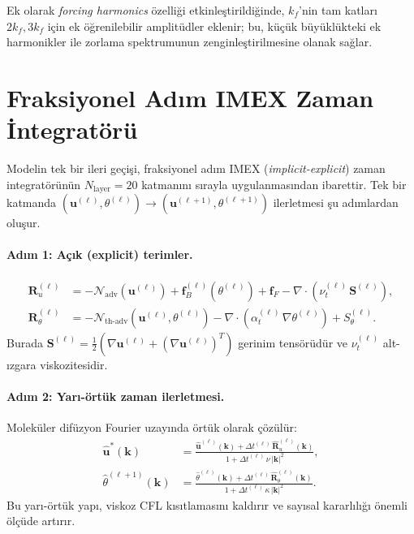 Ek olarak \emph{forcing harmonics} özelliği etkinleştirildiğinde, $k_{f}$'nin tam katları $2k_{f}, 3k_{f}$ için ek öğrenilebilir amplitüdler eklenir; bu, küçük büyüklükteki ek harmonikler ile zorlama spektrumunun zenginleştirilmesine olanak sağlar.

\section{Fraksiyonel Adım IMEX Zaman İntegratörü}
\label{sec:imex_integrator}

Modelin tek bir ileri geçişi, fraksiyonel adım IMEX (\textit{implicit-explicit}) zaman integratörünün $N_{\mathrm{layer}}=20$ katmanını sırayla uygulanmasından ibarettir. Tek bir katmanda $(\mathbf{u}^{(\ell)}, \theta^{(\ell)}) \rightarrow (\mathbf{u}^{(\ell+1)}, \theta^{(\ell+1)})$ ilerletmesi şu adımlardan oluşur.

\paragraph{Adım 1: Açık (explicit) terimler.}
\begin{align}
\mathbf{R}_{u}^{(\ell)} &= -\mathcal{N}_{\mathrm{adv}}(\mathbf{u}^{(\ell)}) + \mathbf{f}_{B}^{(\ell)}(\theta^{(\ell)}) + \mathbf{f}_{F} - \nabla\cdot(\nu_{t}^{(\ell)}\,\mathbf{S}^{(\ell)}), \\
\mathbf{R}_{\theta}^{(\ell)} &= -\mathcal{N}_{\mathrm{th\text{-}adv}}(\mathbf{u}^{(\ell)},\theta^{(\ell)}) - \nabla\cdot(\alpha_{t}^{(\ell)}\,\nabla\theta^{(\ell)}) + S_{\theta}^{(\ell)}.
\end{align}
Burada $\mathbf{S}^{(\ell)} = \tfrac{1}{2}(\nabla\mathbf{u}^{(\ell)} + (\nabla\mathbf{u}^{(\ell)})^{T})$ gerinim tensörüdür ve $\nu_{t}^{(\ell)}$ alt-ızgara viskozitesidir.

\paragraph{Adım 2: Yarı-örtük zaman ilerletmesi.} Moleküler difüzyon Fourier uzayında örtük olarak çözülür:
\begin{align}
\hat{\mathbf{u}}^{*}(\mathbf{k}) &= \frac{\hat{\mathbf{u}}^{(\ell)}(\mathbf{k}) + \Delta t^{(\ell)}\,\hat{\mathbf{R}}_{u}^{(\ell)}(\mathbf{k})}{1 + \Delta t^{(\ell)}\,\nu\,|\mathbf{k}|^{2}}, \label{eq:imex_u}\\
\hat{\theta}^{(\ell+1)}(\mathbf{k}) &= \frac{\hat{\theta}^{(\ell)}(\mathbf{k}) + \Delta t^{(\ell)}\,\hat{\mathbf{R}}_{\theta}^{(\ell)}(\mathbf{k})}{1 + \Delta t^{(\ell)}\,\kappa\,|\mathbf{k}|^{2}}. \label{eq:imex_theta}
\end{align}
Bu yarı-örtük yapı, viskoz CFL kısıtlamasını kaldırır ve sayısal kararlılığı önemli ölçüde artırır.

